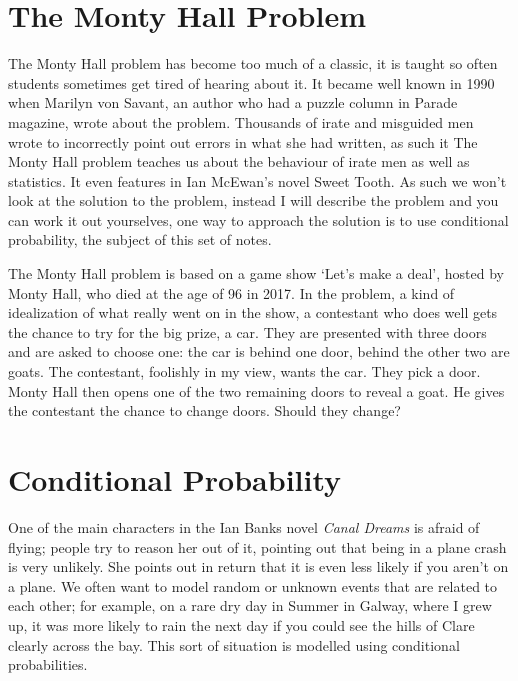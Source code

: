 \documentclass[11pt,a4paper]{scrartcl}
\begin{document}
\section*{The Monty Hall Problem}

The Monty Hall problem has become too much of a classic, it is taught
so often students sometimes get tired of hearing about it. It became
well known in 1990 when Marilyn von Savant, an author who had a puzzle
column in Parade magazine, wrote about the problem. Thousands of irate
and misguided men wrote to incorrectly point out errors in what she
had written, as such it The Monty Hall problem teaches us about the
behaviour of irate men as well as statistics. It even features in Ian
McEwan's novel Sweet Tooth. As such we won't look at the solution to
the problem, instead I will describe the problem and you can work it
out yourselves, one way to approach the solution is to use conditional
probability, the subject of this set of notes.

The Monty Hall problem is based on a game show \lq{}Let's make a
deal\rq{}, hosted by Monty Hall, who died at the age of 96 in 2017. In
the problem, a kind of idealization of what really went on in the
show, a contestant who does well gets the chance to try for the big
prize, a car. They are presented with three doors and are asked to
choose one: the car is behind one door, behind the other two are
goats. The contestant, foolishly in my view, wants the car. They pick
a door. Monty Hall then opens one of the two remaining doors to reveal
a goat. He gives the contestant the chance to change doors. Should
they change?

\section*{Conditional Probability}

One of the main characters in the Ian Banks novel \textit{Canal
  Dreams} is afraid of flying; people try to reason her out of it,
pointing out that being in a plane crash is very unlikely. She points
out in return that it is even less likely if you aren't on a plane. We
often want to model random or unknown events that are related to each
other; for example, on a rare dry day in Summer in Galway, where I
grew up, it was more likely to rain the next day if you could see the
hills of Clare clearly across the bay. This sort of situation is
modelled using conditional probabilities.
\end{document}
